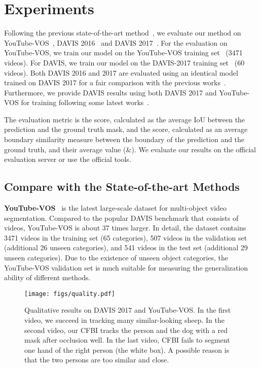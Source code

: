 \documentclass[runningheads]{llncs}
\begin{document}
\section{Experiments}

Following the previous state-of-the-art method~\cite{spacetime},
we evaluate our method on YouTube-VOS~\cite{youtubevos}, DAVIS 2016~\cite{davis2016} and DAVIS 2017~\cite{davis2017}. For the evaluation on YouTube-VOS, we train our model on the YouTube-VOS training set~\cite{youtubevos} (3471 videos). For DAVIS, we train our model on the DAVIS-2017 training set~\cite{davis2017} (60 videos). Both DAVIS 2016 and 2017 are evaluated using an identical model trained on DAVIS 2017 for a fair comparison with the previous works~\cite{feelvos,spacetime}. Furthermore, we provide DAVIS results using both DAVIS 2017 and YouTube-VOS for training following some latest works~\cite{feelvos,spacetime}.

\setlength{\intextsep}{0pt}

The evaluation metric is the  score, calculated as the average IoU between the prediction and the ground truth mask, and the  score, calculated as an average boundary similarity measure between the boundary of the prediction and the ground truth, and their average value (\&). We evaluate our results on the official evaluation server or use the official tools.






\subsection{Compare with the State-of-the-art Methods}



\noindent \textbf{YouTube-VOS}~\cite{youtubevos} is the latest large-scale dataset for multi-object video segmentation. Compared to the popular DAVIS benchmark that consists of  videos, YouTube-VOS is about 37 times larger. In detail, the dataset contains 3471 videos in the training set (65 categories), 507 videos in the validation set (additional 26 unseen categories), and 541 videos in the test set (additional 29 unseen categories). Due to the existence of unseen object categories, the YouTube-VOS validation set is much suitable for measuring the generalization ability of different methods. 

\begin{figure}[t!]
    \centering
    \texttt{[image: figs/quality.pdf]}
    \caption{Qualitative results on DAVIS 2017 and YouTube-VOS. In the first video, we succeed in tracking many similar-looking sheep. In the second video, our CFBI tracks the person and the dog with a red mask after occlusion well. In the last video, CFBI fails to segment one hand of the right person (the white box). A possible reason is that the two persons are too similar and close.}
    \label{fig:quality}
\end{figure}
\end{document}
